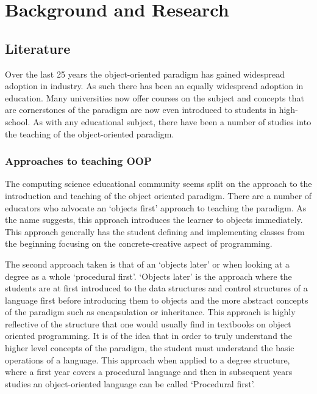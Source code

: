 \documentclass{l4proj}
\begin{document}




\chapter{Background and Research}
\label{B&R}
\section{Literature}
\label{litRev}
Over the last 25 years the object-oriented paradigm has gained widespread adoption in industry. As such there has been an equally widespread adoption in education. Many universities now offer courses on the subject\cite{kentOOP,glasgowOOP,oxfordOOP} and concepts that are cornerstones of the paradigm are now even introduced to students in high-school\cite{sqa}. As with any educational subject, there have been a number of studies into the teaching of the object-oriented paradigm.

\subsection{Approaches to teaching OOP}
\label{approaches}

The computing science educational community seems split on the approach to the introduction and teaching of the object oriented paradigm. There are a number of educators who advocate an `objects first'\cite{empricalOOP} approach to teaching the paradigm. As the name suggests, this approach introduces the learner to objects immediately. This approach generally has the student defining and implementing classes from the beginning focusing on the concrete-creative aspect of programming.   

The second approach taken is that of an `objects later' or when looking at a degree as a whole `procedural first'. `Objects later'\cite{empiricalOOP} is the approach where the students are at first introduced to the data structures and control structures of a language first before introducing them to objects and the more abstract concepts of the paradigm such as encapsulation or inheritance. This approach is highly reflective of the structure that one would usually find in textbooks on object oriented programming. It is of the idea that in order to truly understand the higher level concepts of the paradigm, the student must understand the basic operations of a language. This approach when applied to a degree structure, where a first year covers a procedural language and then in subsequent years studies an object-oriented language can be called `Procedural first'.
\end{document}
